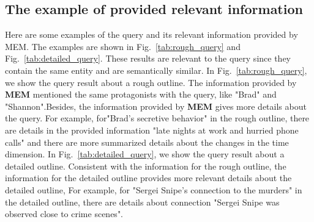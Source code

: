 \subsection{The example of provided relevant information}
\label{sup:relevant information example}
Here are some examples of the query and its relevant information provided by MEM. The examples are shown in Fig.~\ref{tab:rough_query} and Fig.~\ref{tab:detailed_query}. These results are relevant to the query since they contain the same entity and are semantically similar. In Fig.~\ref{tab:rough_query}, we show the query result about a rough outline. The information provided by \textbf{MEM} mentioned the same protagonists with the query, like "Brad" and "Shannon".Besides, the information provided by \textbf{MEM} gives more details about the query. For example, for"Brad's secretive behavior"  in the rough outline, there are details in the provided information "late nights at work and hurried phone calls" and there are more summarized details about the changes in the time dimension. In Fig.~\ref{tab:detailed_query}, we show the query result about a detailed outline. Consistent with the information for the rough outline, the information for the detailed outline provides more relevant details about the detailed outline, For example, for "Sergei Snipe's connection to the murders" in the detailed outline, there are details about connection "Sergei Snipe was observed close to crime scenes".

